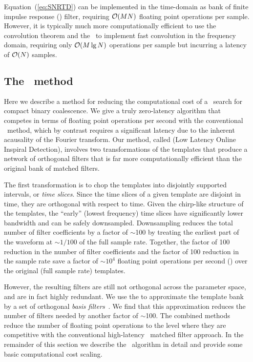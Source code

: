 Equation~(\ref{eq:SNRTD}) can be implemented in the time-domain as bank of
finite impulse response (\fir) filter, requiring $\mathcal O(M
N)$ floating point operations per sample.  However, it is typically
much more computationally efficient to use the convolution theorem and the
\fft\ to implement fast convolution in the frequency domain, requiring only
$\mathcal O(M \lg N)$ operations per sample but incurring
a latency of $\mathcal O(N)$ samples.


\subsection{The \lloid\ method}

Here we describe a method for reducing the computational cost of a \TD\ search
for compact binary coalescence.  We give a truly zero-latency algorithm
that competes in terms of floating point operations per second with the
conventional \FD\ method, which by contrast requires a significant latency due to the
inherent acausality of the Fourier transform.  Our method, called \lloid{}
(Low Latency Online Inspiral Detection),
involves two transformations of the templates that produce a
network of orthogonal filters that is far more computationally
efficient than the original bank of matched filters.

The first transformation is to chop the templates into disjointly supported
intervals, or \emph{time slices}.  Since the time slices of a given template
are disjoint in time, they are orthogonal with respect to time.  Given the
chirp-like structure of the templates, the ``early'' (lowest frequency) time
slices have significantly lower bandwidth and can be safely downsampled.
Downsampling reduces the total number of filter coefficients by a factor of
$\sim$100 by treating the earliest part of the waveform at $\sim$$1/100$ of
the full sample rate.  Together, the factor of 100 reduction in the number of
filter coefficients and the factor of 100 reduction in the sample rate save a
factor of $\sim 10^4$ floating point operations per second (\flops) over the
original (full sample rate) templates.

However, the resulting filters are still not
orthogonal across the parameter space, and are in fact highly redundant.
We use the \SVD{} to approximate the template bank by a set of orthogonal
\emph{basis filters}~\citep{Cannon:2010p10398}.  We find that this approximation
reduces the number of filters needed by another factor of
$\sim$100.  The combined methods reduce the number of floating point operations
to the level where they are competitive with the conventional high-latency \FD\
matched filter approach.  In the remainder of this section we describe the
\lloid\ algorithm in detail and provide some basic computational cost scaling.

